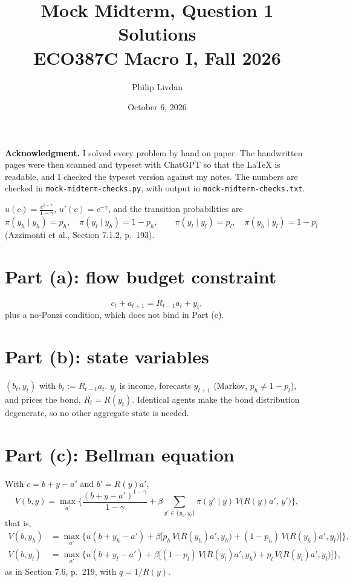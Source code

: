 \documentclass[12pt]{article}
\title{Mock Midterm, Question 1 Solutions\\[1mm] \large ECO387C Macro I, Fall 2026}
\author{Philip Livdan}
\date{October 6, 2026}
\begin{document}
\maketitle

\textbf{Acknowledgment.} I solved every problem by hand on paper. The
handwritten pages were then scanned and typeset with ChatGPT so that the
LaTeX is readable, and I checked the typeset version against my notes.
The numbers are checked in \texttt{mock-midterm-checks.py}, with output in
\texttt{mock-midterm-checks.txt}.

$u(c)=\frac{c^{1-\gamma}}{1-\gamma}$, $u'(c)=c^{-\gamma}$, and the transition probabilities are
\[
  \pi(y_h\mid y_h)=p_h,\quad \pi(y_l\mid y_h)=1-p_h,\qquad
  \pi(y_l\mid y_l)=p_l,\quad \pi(y_h\mid y_l)=1-p_l
\]
(Azzimonti et al., Section 7.1.2, p.\ 193).

\section*{Part (a): flow budget constraint}

\[
  c_t+a_{t+1}=R_{t-1}a_t+y_t ,
\]
plus a no-Ponzi condition, which does not bind in Part (e).

\section*{Part (b): state variables}

$(b_t,y_t)$ with $b_t:=R_{t-1}a_t$. $y_t$ is income, forecasts $y_{t+1}$
(Markov, $p_h\neq1-p_l$), and prices the bond, $R_t=R(y_t)$. Identical
agents make the bond distribution degenerate, so no other aggregate state
is needed.

\section*{Part (c): Bellman equation}

With $c=b+y-a'$ and $b'=R(y)a'$,
\[
  V(b,y)=\max_{a'}\Big\{\frac{(b+y-a')^{1-\gamma}}{1-\gamma}
  +\beta\sum_{y'\in\{y_h,y_l\}}\pi(y'\mid y)\,V\big(R(y)a',\,y'\big)\Big\},
\]
that is,
\begin{align*}
  V(b,y_h)&=\max_{a'}\Big\{u(b+y_h-a')+\beta\Big[p_h\,V\big(R(y_h)a',y_h\big)+(1-p_h)\,V\big(R(y_h)a',y_l\big)\Big]\Big\},\\
  V(b,y_l)&=\max_{a'}\Big\{u(b+y_l-a')+\beta\Big[(1-p_l)\,V\big(R(y_l)a',y_h\big)+p_l\,V\big(R(y_l)a',y_l\big)\Big]\Big\},
\end{align*}
as in Section 7.6, p.\ 219, with $q=1/R(y)$.
\end{document}
